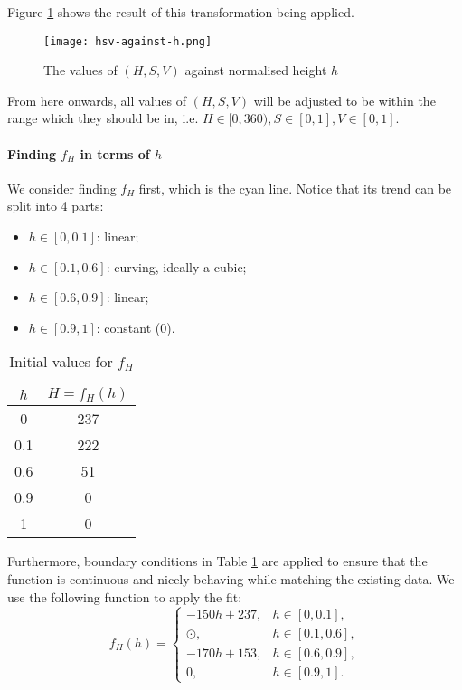 Figure \ref{fig:hsv-against-h} shows the result of this transformation being applied.

\begin{figure}[htp]
    \centering
    \texttt{[image: hsv-against-h.png]}
    \caption{The values of \((H, S, V)\) against normalised height \(h\)}
    \label{fig:hsv-against-h}
\end{figure}

From here onwards, all values of \((H, S, V)\) will be adjusted to be within the range which they should be in, i.e. \(H \in [0, 360), S \in [0, 1], V \in [0, 1]\).

\paragraph{Finding \(f_H\) in terms of \(h\)}

We consider finding \(f_H\) first, which is the cyan line. Notice that its trend can be split into 4 parts:
\begin{itemize}
    \item \(h \in [0, 0.1]\): linear;
    \item \(h \in [0.1, 0.6]\): curving, ideally a cubic;
    \item \(h \in [0.6, 0.9]\): linear;
    \item \(h \in [0.9, 1]\): constant (0).
\end{itemize}

\begin{table}[htp]
    \centering

    \begin{tabular}{|c|c|}
        \hline
        \(h\) & \(H = f_H(h)\) \\
        \hline
        0     & 237            \\
        0.1   & 222            \\
        0.6   & 51             \\
        0.9   & 0              \\
        1     & 0              \\
        \hline
    \end{tabular}
    \caption{Initial values for \(f_H\)}
    \label{tab:h-against-h-iv}
\end{table}

Furthermore, boundary conditions in Table \ref{tab:h-against-h-iv} are applied to ensure that the function is continuous and nicely-behaving while matching the existing data. We use the following function to apply the fit:
\[
    f_H(h) = \begin{cases}
        -150h + 237, & h \in [0, 0.1],   \\
        \odot,       & h \in [0.1, 0.6], \\
        -170h + 153, & h \in [0.6, 0.9], \\
        0,           & h \in [0.9, 1].
    \end{cases}
\]

